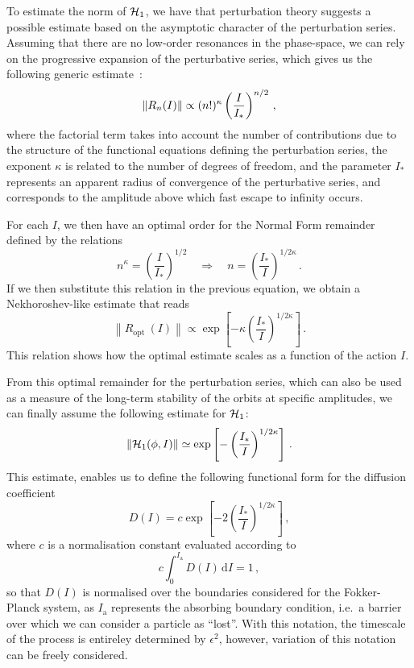 To estimate the norm of $\mathcal{H}_1$, we have that perturbation theory suggests a possible estimate based on the asymptotic character of the perturbation series. Assuming that there are no low-order resonances in the phase-space, we can rely on the progressive expansion of the perturbative series, which gives us the following generic estimate~\cite{}:
\begin{equation}
    \norm{R_n(I)} \propto (n!)^\kappa \left(\frac{I}{I_\ast}\right)^{n/2}\,,
\end{equation}
where the factorial term takes into account the number of contributions due to the structure of the functional equations defining the perturbation series, the exponent $\kappa$ is related to the number of degrees of freedom, and the parameter $I_\ast$ represents an apparent radius of convergence of the perturbative series, and corresponds to the amplitude above which fast escape to infinity occurs.

For each $I$, we then have an optimal order for the Normal Form remainder defined by the relations
\begin{equation}
    n^\kappa=\left(\frac{I}{I_\ast}\right)^{1 / 2} \quad \Rightarrow \quad n=\left(\frac{I_\ast}{I}\right)^{1 / 2 \kappa} \,.
\end{equation}
If we then substitute this relation in the previous equation, we obtain a Nekhoroshev-like estimate that reads
\begin{equation}
    \left\|R_{\text {opt }}(I)\right\| \propto \exp \left[-\kappa\left(\frac{I_*}{I}\right)^{1 / 2 \kappa}\right] \,.
\end{equation}
This relation shows how the optimal estimate scales as a function of the action $I$. 

From this optimal remainder for the perturbation series, which can also be used as a measure of the long-term stability of the orbits at specific amplitudes, we can finally assume the following estimate for $\mathcal{H}_1$:
\begin{equation}
    \left\|\mathcal{H}_1(\phi, I)\right\| \simeq \exp \left[-\left(\frac{I_\ast}{I}\right)^{1/2\kappa}\right] \,.
\end{equation}
This estimate, enables us to define the following functional form for the diffusion coefficient
\begin{equation}
    D(I) = c \exp\left[-2\left(\frac{I_\ast}{I}\right)^{1/2\kappa}\right]\,,
    \label{eq:diffusion}
\end{equation}
where $c$ is a normalisation constant evaluated according to
\begin{equation}
    c \int_0^{I_\text{a}} D(I)\,\mathrm{d}I = 1 \,,
\end{equation}
so that $D(I)$ is normalised over the boundaries considered for the Fokker-Planck system, as $I_\text{a}$ represents the absorbing boundary condition, i.e.\ a barrier over which we can consider a particle as ``lost''. With this notation, the timescale of the process is entireley determined by $\epsilon^2$, however, variation of this notation can be freely considered.

